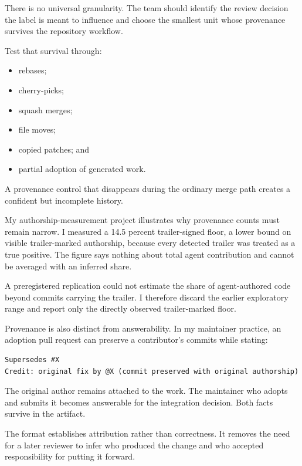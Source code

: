There is no universal granularity. The team should identify the review decision the label is meant to influence and choose the smallest unit whose provenance survives the repository workflow.


Test that survival through:

\begin{itemize}
\tightlist
\item
  rebases;
\item
  cherry-picks;
\item
  squash merges;
\item
  file moves;
\item
  copied patches; and
\item
  partial adoption of generated work.
\end{itemize}

A provenance control that disappears during the ordinary merge path creates a confident but incomplete history.

My authorship-measurement project illustrates why provenance counts must remain narrow. I measured a 14.5 percent trailer-signed floor, a lower bound on visible trailer-marked authorship, because every detected trailer was treated as a true positive. The figure says nothing about total agent contribution and cannot be averaged with an inferred share.

A preregistered replication could not estimate the share of agent-authored code beyond commits carrying the trailer. I therefore discard the earlier exploratory range and report only the directly observed trailer-marked floor.

Provenance is also distinct from answerability. In my maintainer practice, an adoption pull request can preserve a contributor's commits while stating:

\begin{verbatim}
Supersedes #X
Credit: original fix by @X (commit preserved with original authorship)
\end{verbatim}

The original author remains attached to the work. The maintainer who adopts and submits it becomes answerable for the integration decision. Both facts survive in the artifact.

The format establishes attribution rather than correctness. It removes the need for a later reviewer to infer who produced the change and who accepted responsibility for putting it forward.

